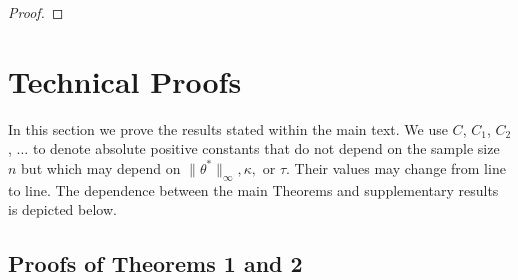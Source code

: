 \documentclass[twoside, onecolumn]{article}
\def\Hcal{\mathcal{H}}
\def\Hcal{\mathcal{H}}
\newtheorem{theorem}{Theorem}
\begin{document}
\begin{proof}
\end{proof}

\section{Technical Proofs}\label{sec:ProofOfTheorems}

In this section we prove the results stated within the main text. We use $C$, $C_1$, $C_2$, $\dots$ to denote absolute positive constants that do not depend on the sample size $n$ but which may depend on $\|\theta^*\|_\infty, \kappa,$ or $\tau$. Their values may change from line to line. The dependence between the main Theorems and supplementary results is depicted below.

\begin{figure}[omitted: a diagram of this paper's results, not reproduced here]\end{figure}





\subsection{Proofs of Theorems 1 and 2}

\end{document}
